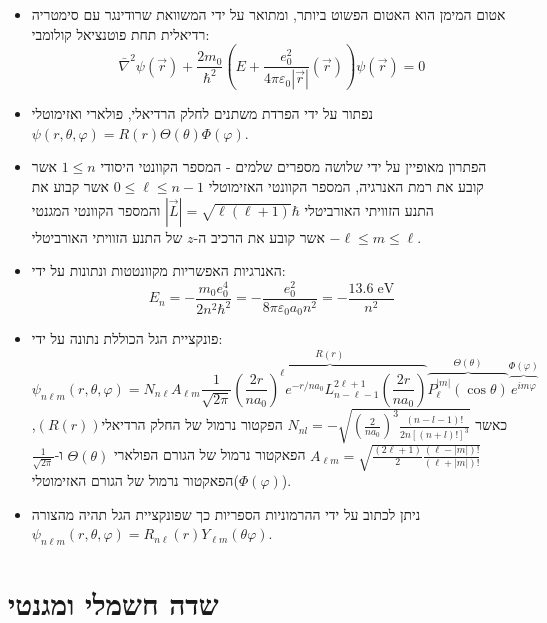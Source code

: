 \documentclass{tstextbook}
\begin{document}
\begin{summary}
  \begin{itemize}
    \item אטום המימן הוא האטום הפשוט ביותר, ומתואר על ידי המשוואת שרודינגר עם סימטריה רדיאלית תחת פוטנציאל קולומבי:
$$ \bar{\nabla}^2 \psi\left(\vec{r}\right)+\frac{2m_{0}}{\hbar^{2}}\left(E+\frac{e_{0}^{2}}{4\pi\varepsilon_{0}\left|\vec{r}\right|}\left(\vec{r}\right)\right) \psi\left(\vec{r}\right)=0 $$
    \item נפתור על ידי הפרדת משתנים לחלק הרדיאלי, פולארי ואזימוטלי \(\psi \left(r,\theta,\varphi\right) =R\left(r\right) \Theta\left(\theta\right) \Phi\left(\varphi\right)\).
    \item הפתרון מאופיין על ידי שלושה מספרים שלמים - המספר הקוונטי היסודי \(1\leq n\) אשר קובע את רמת האנרגיה, המספר הקוונטי האזימוטלי \(0\leq \ell \leq n-1\) אשר קבוע את התנע הזוויתי האורביטלי \(|\vec{L}| = \sqrt{\ell(\ell+1)}\hbar\) והמספר הקוונטי המגנטי \(-\ell \leq m\leq \ell\) אשר קובע את הרכיב ה-\(z\) של התנע הזוויתי האורביטלי.
    \item האנרגיות האפשריות מקוונטטות ונתונות על ידי:
$$ E_{n} = -{\frac{m_{0} e_{0}^{4}}{2n^{2}\hbar^{2}}} = -\frac{e_{0}^{2}}{8\pi\varepsilon_{0}a_{0}n^{2}} = -\frac{13.6 \; \mathrm{eV}}{n^{2}} $$
    \item פונקציית הגל הכוללת נתונה על ידי:
$$ \psi_{n\ell m}\left( r, \theta, \varphi \right) = N_{n\ell} A_{\ell m} \frac{1}{\sqrt{2\pi}}  \overbrace{\left( \frac{2r}{n a_0} \right)^\ell e^{-r/na_0} L_{n-\ell-1}^{2\ell+1} \left( \frac{2r}{n a_0} \right) }^{ R(r) } \overbrace{ P_{\ell}^{|m|} \left( \cos \theta \right) }^{ \Theta\left( \theta \right) } \overbrace{ e^{im\varphi} }^{ \Phi\left( \varphi \right) } $$
כאשר \(N_{n l}=-\sqrt{\left(\frac{2}{n a_{0}}\right)^{3}\frac{(n-l-1)!}{2n[(n+l)!]^{3}}}\) הפקטור נרמול של החלק הרדיאלי\((R(r))\), \(A_{\ell m} = \sqrt{ \frac{(2\ell+1)}{2} \frac{(\ell-|m|)!}{(\ell+|m|)!} }\) הפאקטור נרמול של הגורם הפולארי \(\Theta\left( \theta \right)\) ו-\(\frac{1}{\sqrt{2\pi}}\) הפאקטור נרמול של הגורם האזימוטלי(\(\Phi\left( \varphi \right)\)).
    \item ניתן לכתוב על ידי ההרמוניות הספריות כך שפונקציית הגל תהיה מהצורה \(\psi_{n\ell m}\left( r,\theta,\varphi \right)=R_{n\ell}(r)Y_{\ell m}\left( \theta \varphi \right)\).
  \end{itemize}
\end{summary}
\chapter{שדה חשמלי ומגנטי}
\end{document}
